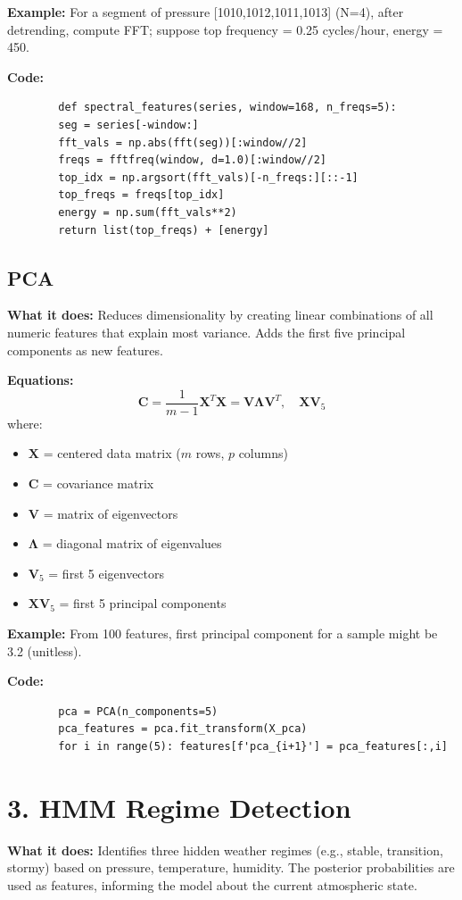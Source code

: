 \documentclass[12pt]{article}
\begin{document}
	\textbf{Example:} For a segment of pressure [1010,1012,1011,1013] (N=4), after detrending, compute FFT; suppose top frequency = 0.25 cycles/hour, energy = 450.
	
	\textbf{Code:}
	\begin{lstlisting}
		def spectral_features(series, window=168, n_freqs=5):
		seg = series[-window:]
		fft_vals = np.abs(fft(seg))[:window//2]
		freqs = fftfreq(window, d=1.0)[:window//2]
		top_idx = np.argsort(fft_vals)[-n_freqs:][::-1]
		top_freqs = freqs[top_idx]
		energy = np.sum(fft_vals**2)
		return list(top_freqs) + [energy]
	\end{lstlisting}
	
	\subsection*{PCA}
	\textbf{What it does:} Reduces dimensionality by creating linear combinations of all numeric features that explain most variance. Adds the first five principal components as new features.
	
	\textbf{Equations:}
	\[
	\mathbf{C} = \frac{1}{m-1}\mathbf{X}^T\mathbf{X} = \mathbf{V}\mathbf{\Lambda}\mathbf{V}^T,\quad
	\mathbf{X}\mathbf{V}_5
	\]
	where:
	\begin{itemize}
		\item $\mathbf{X}$ = centered data matrix ($m$ rows, $p$ columns)
		\item $\mathbf{C}$ = covariance matrix
		\item $\mathbf{V}$ = matrix of eigenvectors
		\item $\mathbf{\Lambda}$ = diagonal matrix of eigenvalues
		\item $\mathbf{V}_5$ = first 5 eigenvectors
		\item $\mathbf{X}\mathbf{V}_5$ = first 5 principal components
	\end{itemize}
	
	\textbf{Example:} From 100 features, first principal component for a sample might be 3.2 (unitless).
	
	\textbf{Code:}
	\begin{lstlisting}
		pca = PCA(n_components=5)
		pca_features = pca.fit_transform(X_pca)
		for i in range(5): features[f'pca_{i+1}'] = pca_features[:,i]
	\end{lstlisting}
	
	\section*{3. HMM Regime Detection}
	\textbf{What it does:} Identifies three hidden weather regimes (e.g., stable, transition, stormy) based on pressure, temperature, humidity. The posterior probabilities are used as features, informing the model about the current atmospheric state.
	
\end{document}
